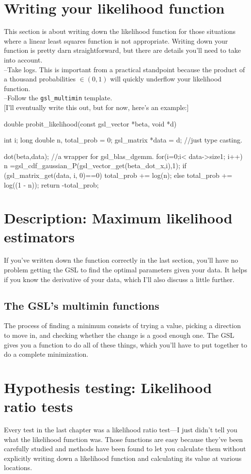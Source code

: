 \section{Writing your likelihood function} 
This section is about writing down the likelihood function for those situations where a linear least
squares function is not appropriate.
Writing down your function
is pretty darn straightforward, but there are details you'll need to take into account.\\
--Take logs. This is important from a practical standpoint because the product of a thousand probabilities
$\in (0,1)$ will quickly underflow your likelihood function. \\
--Follow the {\tt gsl\_multimin} template.\\

[I'll eventually write this out, but for now, here's an example:]


double probit_likelihood(const gsl_vector *beta, void *d){
int		    i;
long double	n, total_prob	= 0;
gsl_matrix  *data 		    = d;		//just type casting.

   dot(beta,data);    //a wrapper for gsl_blas_dgemm.
   for(i=0;i< data->size1; i++){
      n	=gsl_cdf_gaussian_P(gsl_vector_get(beta_dot_x,i),1);
      if (gsl_matrix_get(data, i, 0)==0) 	total_prob	+= log(n);
      else 					total_prob	+= log((1 - n));
   }
   return -total_prob;
}

\section{Description: Maximum likelihood estimators} 
If you've written
down the function correctly in the last section, you'll have no problem
getting the GSL to find the optimal parameters given your data.  It helps
if you know the derivative of your data, which I'll also discuss a little
further.

\subsection{The GSL's multimin functions} The process of finding a minimum consists of trying a
value, picking a direction to move in, and checking whether the change is a good enough one. The GSL
gives you a function to do all of these things, which you'll have to put together to do a complete
minimization.

\section{Hypothesis testing: Likelihood ratio tests} Every test
in the last chapter was a likelihood ratio test---I just didn't tell
you what the likelihood function was. Those functions are easy because
they've been carefully studied and methods have been found to let you
calculate them without explicitly writing down a likelihood function
and calculating its value at various locations.

